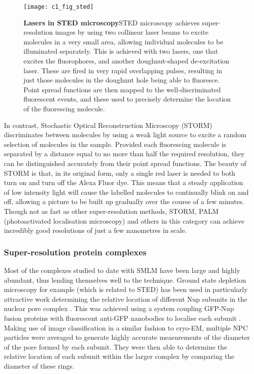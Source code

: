 \documentclass[a4paper,11pt,twoside,openright]{scrbook}
\begin{document}
\begin{figure}[h]
\fcapsideright
    {\caption[Lasers in STED microscopy]{\sffamily\textbf{Lasers in STED
    microscopy}\newline \small STED microscopy achieves super-resolution images
    by using two collinear laser beams to excite molecules in a very small area,
    allowing individual molecules to be illuminated separately. This is achieved
    with two lasers, one that excites the fluorophores, and another
    doughnut-shaped de-excitation laser. These are fired in very rapid
    overlapping pulses, resulting in just those molecules in the doughnut hole
    being able to fluoresce. Point spread functions are then mapped to the
    well-discriminated fluorescent events, and these used to precisely determine
    the location of the fluorescing molecule.}\label{figure:sted}}
    {\texttt{[image: c1\_fig\_sted]}}
\end{figure}

In contrast, Stochastic Optical Reconstruction Microscopy \cite{Rust2006}
(STORM) discriminates between molecules by using a weak light source to excite a
random selection of molecules in the sample. Provided each fluorescing molecule
is separated by a distance equal to no more than half the required resolution,
they can be distinguished accurately from their point spread functions. The
beauty of STORM is that, in its original form, only a single red laser is needed
to both turn on and turn off the Alexa Fluor dye. This means that a steady
application of low intensity light will cause the labelled molecules to
continually blink on and off, allowing a picture to be built up gradually over
the course of a few minutes. Though not as fast as other super-resolution
methods, STORM, PALM (photoactivated localisation microscopy) and others in this
category can achieve incredibly good resolutions of just a few nanometres in
scale.

\subsubsection{Super-resolution protein complexes}
Most of the complexes studied to date with SMLM have been large and highly
abundant, thus lending themselves well to the technique. Ground state depletion
microscopy for example (which is related to STED) has been used in particularly
attractive work determining the relative location of different Nup subunits in
the nuclear pore complex \cite{Szymborska2013}. This was achieved using a system
coupling GFP-Nup fusion proteins with fluorescent anti-GFP nanobodies to
localise each subunit \cite{Ries2012}. Making use of image classification in a
similar fashion to cryo-EM, multiple NPC particles were averaged to generate
highly accurate measurements of the diameter of the pore formed by each subunit.
They were then able to determine the relative location of each subunit within
the larger complex by comparing the diameter of these rings.
\end{document}
